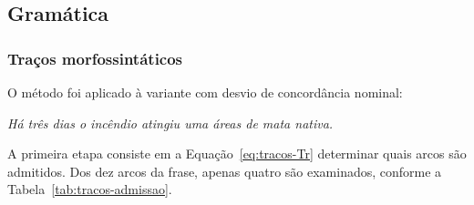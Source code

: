 \subsection{Gramática}
\label{res:gramatica}

\subsubsection{Traços morfossintáticos}
\label{res:tracos}

O método foi aplicado à variante com desvio de concordância nominal:
%
\begin{center}
\emph{Há três dias o incêndio atingiu uma áreas de mata nativa.}
\end{center}

A primeira etapa consiste em a Equação~\ref{eq:tracos-Tr} determinar quais arcos são
admitidos. Dos dez arcos da frase, apenas quatro são examinados, conforme a
Tabela~\ref{tab:tracos-admissao}.

\begin{table}[H]
\centering
{}
\caption{Os dez arcos da frase e o conjunto de traços que cada um exige.}
\label{tab:tracos-admissao}
\end{table}

